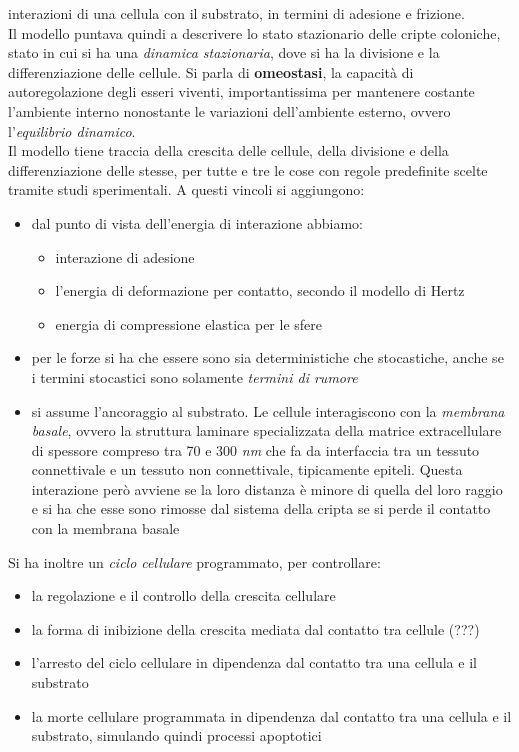 \documentclass[a4paper,12pt, oneside]{book}
\begin{document}
interazioni di una cellula con il substrato, in termini di adesione e
frizione. \\
Il modello puntava quindi a descrivere lo stato stazionario delle cripte
coloniche, stato in cui si ha una \textit{dinamica stazionaria}, dove si ha la
divisione e la differenziazione delle cellule. Si parla di \textbf{omeostasi},
la capacità di autoregolazione degli esseri viventi, importantissima per
mantenere costante l'ambiente interno nonostante le variazioni dell'ambiente
esterno, ovvero l'\textit{equilibrio dinamico}.\\
Il modello tiene traccia della crescita delle cellule, della divisione e della
differenziazione delle stesse, per tutte e tre le cose con regole predefinite
scelte tramite studi sperimentali. A questi vincoli si aggiungono:
\begin{itemize}
  \item dal punto di vista dell'energia di interazione abbiamo:
  \begin{itemize}
    \item interazione di adesione
    \item l'energia di deformazione per contatto, secondo il modello di Hertz
    \item energia di compressione elastica per le sfere 
  \end{itemize}
  \item per le forze si ha che essere sono sia deterministiche che stocastiche,
  anche se i termini stocastici sono solamente \textit{termini di rumore}
  \item si assume l'ancoraggio al substrato. Le cellule interagiscono con la
  \textit{membrana basale}, ovvero la struttura laminare specializzata della
  matrice extracellulare di spessore compreso tra 70 e 300 \textit{nm} che fa da
  interfaccia tra un tessuto connettivale e un tessuto non connettivale, 
  tipicamente epiteli. Questa interazione però avviene se la loro distanza è
  minore di quella del loro raggio e si ha che esse sono rimosse dal sistema
  della cripta se si perde il contatto con la membrana basale
\end{itemize}
Si ha inoltre un \textit{ciclo cellulare} programmato, per controllare:
\begin{itemize}
  \item la regolazione e il controllo della crescita cellulare
  \item la forma di inibizione della crescita mediata dal contatto tra cellule
  (???) 
  \item l'arresto del ciclo cellulare in dipendenza dal contatto tra una cellula
  e il substrato
  \item la morte cellulare programmata in dipendenza dal contatto tra una
  cellula e il substrato, simulando quindi processi apoptotici
\end{itemize}
\end{document}
